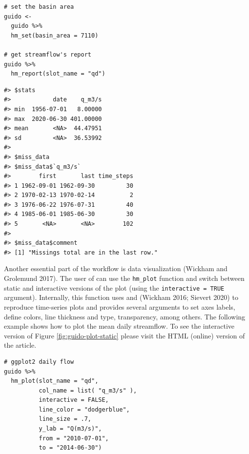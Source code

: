 \begin{verbatim}
# set the basin area
guido <- 
  guido %>% 
  hm_set(basin_area = 7110)

# get streamflow's report
guido %>% 
  hm_report(slot_name = "qd")
\end{verbatim}

\begin{verbatim}
#> $stats
#>            date    q_m3/s
#> min  1956-07-01   8.00000
#> max  2020-06-30 401.00000
#> mean       <NA>  44.47951
#> sd         <NA>  36.53992
#> 
#> $miss_data
#> $miss_data$`q_m3/s`
#>        first       last time_steps
#> 1 1962-09-01 1962-09-30         30
#> 2 1970-02-13 1970-02-14          2
#> 3 1976-06-22 1976-07-31         40
#> 4 1985-06-01 1985-06-30         30
#> 5       <NA>       <NA>        102
#> 
#> $miss_data$comment
#> [1] "Missings total are in the last row."
\end{verbatim}

Another essential part of the workflow is data visualization
(Wickham and Grolemund 2017). The user of  can use the \texttt{hm\_plot}
function and switch between static and interactive versions of the plot
(using the \texttt{interactive\ =\ TRUE} argument). Internally, this function
uses  and  (Wickham 2016; Sievert 2020)
to reproduce time-series plots and provides several arguments to set
axes labels, define colors, line thickness
and type, transparency, among others. The following
example shows how to plot the mean daily streamflow. To see the interactive version
of Figure \ref{fig:guido-plot-static}
please visit the HTML (online) version of the article.

\begin{verbatim}
# ggplot2 daily flow
guido %>% 
  hm_plot(slot_name = "qd",
          col_name = list( "q_m3/s" ), 
          interactive = FALSE, 
          line_color = "dodgerblue",
          line_size = .7,
          y_lab = "Q(m3/s)", 
          from = "2010-07-01", 
          to = "2014-06-30") 
\end{verbatim}

